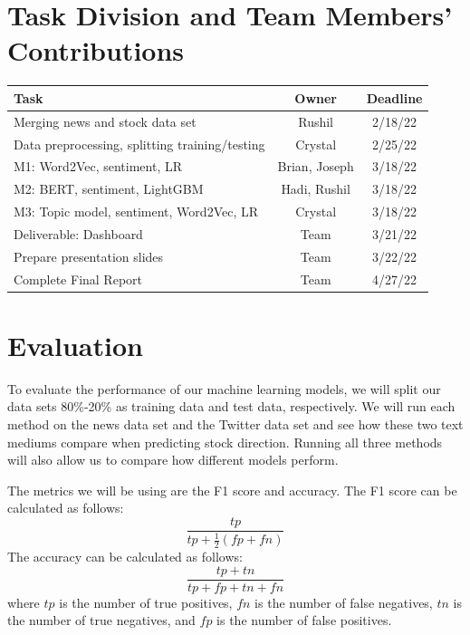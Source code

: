 \documentclass[conference]{IEEEtran}
\begin{document}
\section{Task Division and Team Members' Contributions}
\begin{table}[htp]
    \begin{center}
        \begin{tabular}{|l||c|c|} \hline\hline
            Task                                               & Owner         & Deadline  \\ \hline
            Merging news and stock data set                    & Rushil        & 2/18/22   \\
            Data preprocessing, splitting training/testing & Crystal       & 2/25/22   \\
            M1: Word2Vec, sentiment, LR                  & Brian, Joseph & 3/18/22   \\
            M2: BERT, sentiment, LightGBM                & Hadi, Rushil  & 3/18/22   \\
            M3: Topic model, sentiment, Word2Vec, LR     & Crystal       & 3/18/22 \\
            Deliverable: Dashboard                             & Team          & 3/21/22 \\
            Prepare presentation slides                             & Team          & 3/22/22 \\
            Complete Final Report                             & Team          & 4/27/22 \\
            \hline\hline
        \end{tabular}
    \end{center}
\end{table}

\section{Evaluation}
To evaluate the performance of our machine learning models, we will split our data sets 80\%-20\% as training data and test data, respectively. We will run each method on the news data set and the Twitter data set and see how these two text mediums compare when predicting stock direction. Running all three methods will also allow us to compare how different models perform. 

The metrics we will be using are the F1 score and accuracy. The F1 score can be calculated as follows:
\begin{equation*}
 \frac{tp}{tp+\frac{1}{2}(fp+fn)}
\end{equation*}
The accuracy can be calculated as follows:
\begin{equation*}
 \frac{tp + tn}{tp + fp + tn + fn}
\end{equation*}
where $tp$ is the number of true positives, $fn$ is the number of false negatives, $tn$ is the number of true negatives, and $fp$ is the number of false positives. 
\end{document}
